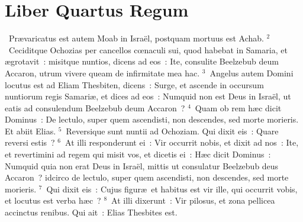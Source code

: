 {\centering \section*{Liber Quartus Regum}}\thispagestyle{empty}

~\lettrine[lines=10,image=true,loversize=0.05,lraise=-0.03]{P}{}r\ae varicatus est autem Moab in Isra\"el, postquam mortuus est Achab.
${}^{2}$~Ceciditque Ochozias per cancellos cœnaculi sui, quod habebat in Samaria, et \ae grotavit~: misitque nuntios, dicens ad eos~: Ite, consulite Beelzebub deum Accaron, utrum vivere queam de infirmitate mea hac.
${}^{3}$~Angelus autem Domini locutus est ad Eliam Thesbiten, dicens~: Surge, et ascende in occursum nuntiorum regis Samari\ae , et dices ad eos~: Numquid non est Deus in Isra\"el, ut eatis ad consulendum Beelzebub deum Accaron~?
${}^{4}$~Quam ob rem h\ae c dicit Dominus~: De lectulo, super quem ascendisti, non descendes, sed morte morieris. Et abiit Elias.
${}^{5}$~Reversique sunt nuntii ad Ochoziam. Qui dixit eis~: Quare reversi estis~?
${}^{6}$~At illi responderunt ei~: Vir occurrit nobis, et dixit ad nos~: Ite, et revertimini ad regem qui misit vos, et dicetis ei~: H\ae c dicit Dominus~: Numquid quia non erat Deus in Isra\"el, mittis ut consulatur Beelzebub deus Accaron~? idcirco de lectulo, super quem ascendisti, non descendes, sed morte morieris.
${}^{7}$~Qui dixit eis~: Cujus figur\ae\ et habitus est vir ille, qui occurrit vobis, et locutus est verba h\ae c~?
${}^{8}$~At illi dixerunt~: Vir pilosus, et zona pellicea accinctus renibus. Qui ait~: Elias Thesbites est.


